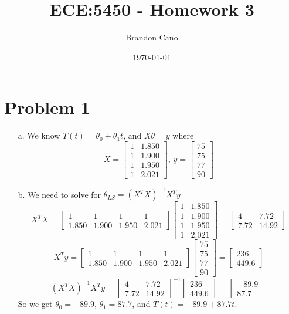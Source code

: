 \documentclass[12pt]{article}
\title{ECE:5450 - Homework 3}
\author{Brandon Cano}
\date{\today}
\begin{document}
\maketitle

\section*{Problem 1}


\begin{enumerate}
	\item[a.] We know $T(t) = \theta_{0} + \theta_{1}t$, and $X\theta = y$ where
	\[
	X = \begin{bmatrix}
	1 & 1.850 \\
	1 & 1.900 \\
	1 & 1.950 \\
	1 & 2.021
	\end{bmatrix},\,
	y = \begin{bmatrix}
	75 \\
	75 \\
	77 \\
	90
	\end{bmatrix}
	\]
	
	\item[b.] We need to solve for $\theta_{LS} = (X^{T}X)^{-1}X^{T}y$
	\[
	X^{T}X = \begin{bmatrix}
	1 & 1 & 1 & 1 \\
	1.850 & 1.900 & 1.950 & 2.021
	\end{bmatrix}
	\begin{bmatrix}
	1 & 1.850 \\
	1 & 1.900 \\
	1 & 1.950 \\
	1 & 2.021
	\end{bmatrix} =
	\begin{bmatrix}
	4 & 7.72 \\
	7.72 & 14.92 
	\end{bmatrix}
	\]
	\[
	X^{T}y = \begin{bmatrix}
	1 & 1 & 1 & 1 \\
	1.850 & 1.900 & 1.950 & 2.021
	\end{bmatrix}
	\begin{bmatrix}
	75 \\ 75 \\ 77 \\ 90
	\end{bmatrix} =
	\begin{bmatrix}
	236 \\ 449.6
	\end{bmatrix}
	\]
	\[
	(X^{T}X)^{-1}X^{T}y = \begin{bmatrix}
	4 & 7.72 \\
	7.72 & 14.92 
	\end{bmatrix}^{-1}
	\begin{bmatrix}
	236 \\ 449.6
	\end{bmatrix} = 
	\begin{bmatrix}
	-89.9 \\ 87.7
	\end{bmatrix}
	\]
	So we get $\theta_{0} = -89.9$, $\theta_{1} = 87.7$, and $T(t) = -89.9+87.7t$.
	

\end{enumerate}
\end{document}
